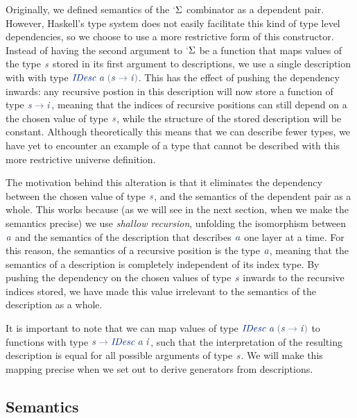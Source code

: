 \documentclass[a4paper,msc,twosized=semi]{uustthesis}
\newcommand*{\mathcolor}{}
\def\mathcolor#1#{\mathcoloraux{#1}}
\newcommand*{\mathcoloraux}[3]{%
  \protect\leavevmode
  \begingroup
    \color#1{#2}#3%
  \endgroup
}
\newcommand{\HSSpecial}[1]{\mathcolor{hsblue4}{#1}}
\newcommand{\HSSym}[1]{\mathcolor{hsblue4}{#1}}
\newcommand{\HSCon}[1]{\mathcolor{hsblue3}{\mathit{#1}}}
\newcommand{\HSVar}[1]{\mathcolor{hsblue5}{\mathit{#1}}}
\begin{document}
  Originally, we defined semantics of the \ensuremath{\HSSpecial{`}\Sigma } combinator as a dependent pair. However, Haskell's type system does not easily facilitate this kind of type level dependencies, so we choose to use a more restrictive form of this constructor. Instead of having the second argument to \ensuremath{\HSSpecial{`}\Sigma } be a function that maps values of the type \ensuremath{\HSVar{s}} stored in its first argument to descriptions, we use a single description with with type \ensuremath{\HSCon{IDesc}\;\HSVar{a}\;\HSSpecial{(}\HSVar{s}\HSSym{\to} \HSVar{i}\HSSpecial{)}}. This has the effect of pushing the dependency inwards: any recursive postion in this description will now store a function of type \ensuremath{\HSVar{s}\HSSym{\to} \HSVar{i}}, meaning that the indices of recursive positions can still depend on a the chosen value of type \ensuremath{\HSVar{s}}, while the structure of the stored description will be constant. Although theoretically this means that we can describe fewer types, we have yet to encounter an example of a type that cannot be described with this more restrictive universe definition. 
  
  The motivation behind this alteration is that it eliminates the dependency between the chosen value of type \ensuremath{\HSVar{s}}, and the semantics of the dependent pair as a whole. This works because (as we will see in the next section, when we make the semantics precise) we use \emph{shallow recursion}, unfolding the isomorphism between \ensuremath{\HSVar{a}} and the semantics of the description that describes \ensuremath{\HSVar{a}} one layer at a time. For this reason, the semantics of a recursive position is the type \ensuremath{\HSVar{a}}, meaning that the semantics of a description is completely independent of its index type. By pushing the dependency on the chosen values of type \ensuremath{\HSVar{s}} inwards to the recursive indices stored, we have made this value irrelevant to the semantics of the description as a whole. 
  
  It is important to note that we can map values of type \ensuremath{\HSCon{IDesc}\;\HSVar{a}\;\HSSpecial{(}\HSVar{s}\HSSym{\to} \HSVar{i}\HSSpecial{)}} to functions with type \ensuremath{\HSVar{s}\HSSym{\to} \HSCon{IDesc}\;\HSVar{a}\;\HSVar{i}}, such that the interpretation of the resulting description is equal for all possible arguments of type \ensuremath{\HSVar{s}}. We will make this mapping precise when we set out to derive generators from descriptions. 

\subsection{Semantics}
\end{document}
